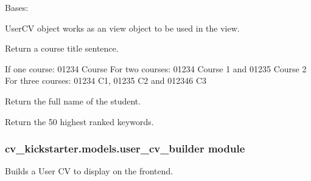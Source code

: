 \documentclass[letterpaper,10pt,english]{sphinxmanual}
\begin{document}
\begin{fulllineitems}
\label{cv_kickstarter.models:cv_kickstarter.models.user_cv.UserCV}
Bases: 

UserCV object works as an view object to be used in the view.

\begin{fulllineitems}
\label{cv_kickstarter.models:cv_kickstarter.models.user_cv.UserCV.course_title_sentence}
Return a course title sentence.

If one course: 01234 Course
For two courses: 01234 Course 1 and 01235 Course 2
For three courses: 01234 C1, 01235 C2 and 012346 C3

\end{fulllineitems}


\begin{fulllineitems}
\label{cv_kickstarter.models:cv_kickstarter.models.user_cv.UserCV.full_name}
Return the full name of the student.

\end{fulllineitems}


\begin{fulllineitems}
\label{cv_kickstarter.models:cv_kickstarter.models.user_cv.UserCV.highest_ranked_keywords}
Return the 50 highest ranked keywords.

\end{fulllineitems}


\end{fulllineitems}



\subsubsection{cv\_kickstarter.models.user\_cv\_builder module}
\label{cv_kickstarter.models:module-cv_kickstarter.models.user_cv_builder}\label{cv_kickstarter.models:cv-kickstarter-models-user-cv-builder-module}
Builds a User CV to display on the frontend.
\end{document}
